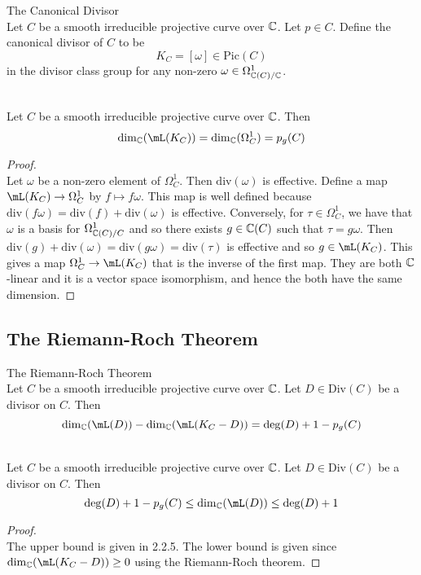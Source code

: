 \documentclass[a4paper]{article}
\begin{document}
\begin{defn}{The Canonical Divisor}{}\\
Let $C$ be a smooth irreducible projective curve over $\mathbb{C}$. Let $p\in C$. Define the canonical divisor of $C$ to be $$K_C=[\omega]\in\text{Pic}(C)$$ in the divisor class group for any non-zero $\omega\in\Omega_{\mathbb{C}(C)/\mathbb{C}}^1$. 
\end{defn}

\begin{lmm}{}{}\\
Let $C$ be a smooth irreducible projective curve over $\mathbb{C}$. Then $$\dim_\C(\mL(K_C))=\dim_\C(\Omega_C^1)=p_g(C)$$
\begin{proof}\\
Let $\omega$ be a non-zero element of $\Omega_C^1$. Then $\text{div}(\omega)$ is effective. Define a map $\mL(K_C)\to\Omega_C^1$ by $f\mapsto f\omega$. This map is well defined because $\text{div}(f\omega)=\text{div}(f)+\text{div}(\omega)$ is effective. Conversely, for $\tau\in\Omega_C^1$, we have that $\omega$ is a basis for $\Omega_{\mathbb{C}(C)/C}^1$ and so there exists $g\in\mathbb{C}(C)$ such that $\tau=g\omega$. Then $\text{div}(g)+\text{div}(\omega)=\text{div}(g\omega)=\text{div}(\tau)$ is effective and so $g\in\mL(K_C)$. This gives a map $\Omega_C^1\to\mL(K_C)$ that is the inverse of the first map. They are both $\mathbb{C}$-linear and it is a vector space isomorphism, and hence the both have the same dimension. 
\end{proof}
\end{lmm}

\subsection{The Riemann-Roch Theorem}
\begin{thm}{The Riemann-Roch Theorem}{}\\
Let $C$ be a smooth irreducible projective curve over $\mathbb{C}$. Let $D\in\text{Div}(C)$ be a divisor on $C$. Then $$\dim_\C(\mL(D))-\dim_\C(\mL(K_C-D))=\deg(D)+1-p_g(C)$$
\end{thm}

\begin{prp}{}{}\\
Let $C$ be a smooth irreducible projective curve over $\mathbb{C}$. Let $D\in\text{Div}(C)$ be a divisor on $C$. Then $$\deg(D)+1-p_g(C)\leq\dim_\C(\mL(D))\leq\deg(D)+1$$
\begin{proof}\\
The upper bound is given in 2.2.5. The lower bound is given since $\dim_\C(\mL(K_C-D))\geq 0$ using the Riemann-Roch theorem. 
\end{proof}
\end{prp}
\end{document}
